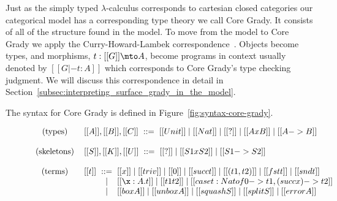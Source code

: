 Just as the simply typed $\lambda$-calculus corresponds to cartesian
closed categories our categorical model has a corresponding type
theory we call Core Grady.  It consists of all of the structure found
in the model.  To move from the model to Core Grady we apply the
Curry-Howard-Lambek
correspondence~\cite{Wadler:2015:PT:2847579.2699407,Lambek:1980}.
Objects become types, and morphisms, $t : [[G]] \mto A$, become
programs in context usually denoted by $[[G |- t : A]]$ which
corresponds to Core Grady's type checking judgment.  We will discuss
this correspondence in detail in
Section~\ref{subsec:interpreting_surface_grady_in_the_model}.

The syntax for Core Grady is defined in
Figure~\ref{fig:syntax-core-grady}.
\begin{figure}
  \scriptsize
  \begin{mdframed}
    \[
    \setlength{\arraycolsep}{3pt}
    \begin{array}{cl}      
        \begin{array}{l}
          \text{(types)}\\
        \end{array}     &
        \begin{array}{lcl}
          [[A]],[[B]],[[C]] & ::= & [[Unit]] \mid [[Nat]] \mid [[?]] \mid [[A x B]] \mid [[A -> B]] \\
        \end{array}\\\\
        
        \begin{array}{lll}
          \text{(skeletons)}\\
        \end{array} &
        \begin{array}{lcl}
          [[S]],[[K]],[[U]] & ::= & [[?]] \mid [[S1 x S2]] \mid [[S1 -> S2]]\\
        \end{array}\\\\
        
        \begin{array}{l}
          \text{(terms)}\\\\\\\\
        \end{array}     &
        \begin{array}{lcl}
          [[t]] & ::= & [[x]] \mid [[triv]] \mid [[0]] \mid [[succ t]] \mid [[(t1 , t2)]] \mid [[fst t]] \mid [[snd t]] \\ & \mid & [[\x : A.t]] \mid [[t1 t2]] \mid [[case t : Nat of 0 -> t1, (succ x) -> t2]]\\ & \mid & [[box A]] \mid [[unbox A]] \mid [[squash S]] \mid [[split S]] \mid [[error A]]\\\\
        \end{array}\\\\
        

\end{array}\]
\end{mdframed}
\end{figure}
